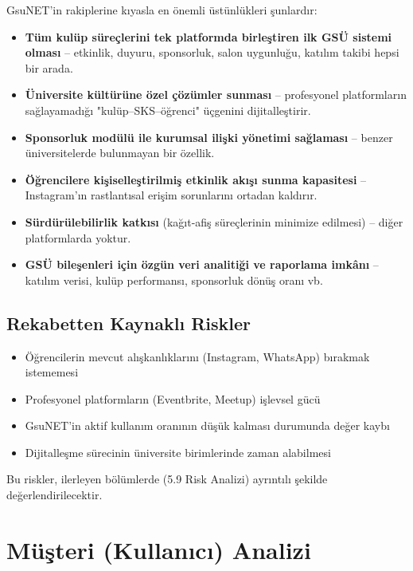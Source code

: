 \documentclass[a4paper,12pt]{report}
\begin{document}
GsuNET'in rakiplerine kıyasla en önemli üstünlükleri şunlardır:

\begin{itemize}
    \item \textbf{Tüm kulüp süreçlerini tek platformda birleştiren ilk GSÜ sistemi olması} – etkinlik, duyuru, sponsorluk, salon uygunluğu, katılım takibi hepsi bir arada.

    \item \textbf{Üniversite kültürüne özel çözümler sunması} – profesyonel platformların sağlayamadığı "kulüp–SKS–öğrenci" üçgenini dijitalleştirir.

    \item \textbf{Sponsorluk modülü ile kurumsal ilişki yönetimi sağlaması} – benzer üniversitelerde bulunmayan bir özellik.

    \item \textbf{Öğrencilere kişiselleştirilmiş etkinlik akışı sunma kapasitesi} – Instagram'ın rastlantısal erişim sorunlarını ortadan kaldırır.

    \item \textbf{Sürdürülebilirlik katkısı} (kağıt-afiş süreçlerinin minimize edilmesi) – diğer platformlarda yoktur.

    \item \textbf{GSÜ bileşenleri için özgün veri analitiği ve raporlama imkânı} – katılım verisi, kulüp performansı, sponsorluk dönüş oranı vb.
\end{itemize}

\subsection{Rekabetten Kaynaklı Riskler}

\begin{itemize}
    \item Öğrencilerin mevcut alışkanlıklarını (Instagram, WhatsApp) bırakmak istememesi
    \item Profesyonel platformların (Eventbrite, Meetup) işlevsel gücü
    \item GsuNET'in aktif kullanım oranının düşük kalması durumunda değer kaybı
    \item Dijitalleşme sürecinin üniversite birimlerinde zaman alabilmesi
\end{itemize}

Bu riskler, ilerleyen bölümlerde (5.9 Risk Analizi) ayrıntılı şekilde değerlendirilecektir.

\section{Müşteri (Kullanıcı) Analizi}
\end{document}
